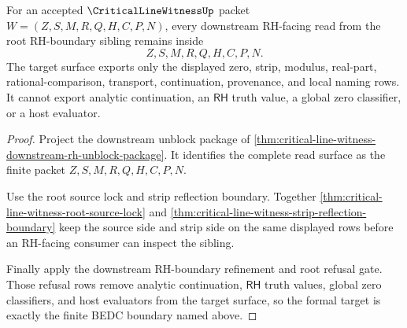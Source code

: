 \begin{theorem}
\label{thm:criticallinewitness-root-rh-boundary-formal-target}
For an accepted $\CriticalLineWitnessUp$ packet $W=(Z,S,M,R,Q,H,C,P,N)$, every downstream RH-facing read from the root RH-boundary sibling remains inside
$$
Z,S,M,R,Q,H,C,P,N.
$$
The target surface exports only the displayed zero, strip, modulus, real-part, rational-comparison, transport, continuation, provenance, and local naming rows. It cannot export analytic continuation, an $\mathsf{RH}$ truth value, a global zero classifier, or a host evaluator.
\end{theorem}
\begin{proof}
Project the downstream unblock package of \autoref{thm:critical-line-witness-downstream-rh-unblock-package}. It identifies the complete read surface as the finite packet $Z,S,M,R,Q,H,C,P,N$.

Use the root source lock and strip reflection boundary. Together \autoref{thm:critical-line-witness-root-source-lock} and \autoref{thm:critical-line-witness-strip-reflection-boundary} keep the source side and strip side on the same displayed rows before an RH-facing consumer can inspect the sibling.

Finally apply the downstream RH-boundary refinement and root refusal gate. Those refusal rows remove analytic continuation, $\mathsf{RH}$ truth values, global zero classifiers, and host evaluators from the target surface, so the formal target is exactly the finite BEDC boundary named above.
\end{proof}
